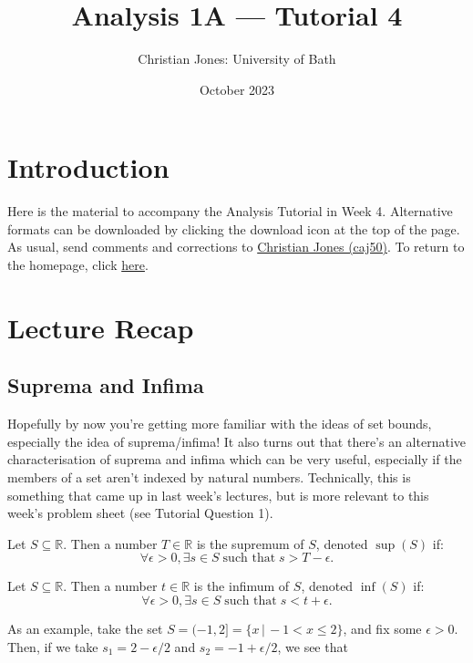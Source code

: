 \documentclass[
  10pt,
  a4paper]{article}
\title{Analysis 1A --- Tutorial 4}
\author{Christian Jones: University of Bath}
\date{October 2023}
\theoremstyle{plain}
\theoremstyle{definition}
\theoremstyle{plain}
\theoremstyle{plain}
\theoremstyle{plain}
\theoremstyle{plain}
\theoremstyle{definition}
\theoremstyle{definition}
\theoremstyle{remark}
\theoremstyle{remark}
\let\BeginKnitrBlock\begin \let\EndKnitrBlock\end
\begin{document}
\maketitle

{
\setcounter{tocdepth}{2}
\tableofcontents
}
\newpage
{}

\hypertarget{introduction}{%
\section*{Introduction}\label{introduction}}

Here is the material to accompany the Analysis Tutorial in Week 4. Alternative formats can be downloaded by clicking the download icon at the top of the page. As usual, send comments and corrections to \href{mailto:caj50@bath.ac.uk}{Christian Jones (caj50)}. To return to the homepage, click \href{http://caj50.github.io/tutoring.html}{here}.

\hypertarget{lecture-recap}{%
\section{Lecture Recap}\label{lecture-recap}}

\hypertarget{suprema-and-infima}{%
\subsection{Suprema and Infima}\label{suprema-and-infima}}

Hopefully by now you're getting more familiar with the ideas of set bounds, especially the idea of suprema/infima! It also turns out that there's an alternative characterisation of suprema and infima which can be very useful, especially if the members of a set aren't indexed by natural numbers. Technically, this is something that came up in last week's lectures, but is more relevant to this week's problem sheet (see Tutorial Question 1).

\BeginKnitrBlock{proposition}
{\label{prp:prop1} }Let \(S\subseteq\mathbb{R}\). Then a number \(T\in\mathbb{R}\) is the supremum of \(S\), denoted \(\sup(S)\) if: \[\forall \epsilon > 0, \exists s \in S\; \text{such that} \; s > T - \epsilon.\]
\EndKnitrBlock{proposition}

\BeginKnitrBlock{proposition}
{\label{prp:prop2} }Let \(S\subseteq\mathbb{R}\). Then a number \(t\in\mathbb{R}\) is the infimum of \(S\), denoted \(\inf(S)\) if: \[\forall \epsilon > 0, \exists s \in S\; \text{such that} \; s < t + \epsilon.\]
\EndKnitrBlock{proposition}
As an example, take the set \(S = (-1,2] = \lbrace x \, \lvert\, -1 < x \leq 2\rbrace\), and fix some \(\epsilon > 0\). Then, if we take \(s_1 = 2 - \epsilon/2\) and \(s_2 = -1 + \epsilon/2\), we see that
\end{document}
